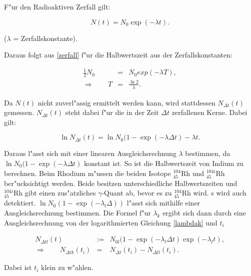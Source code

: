 		F"ur den Radioaktiven Zerfall gilt:

		\begin{equation}
			N(t) = N_0 \exp{(-\lambda t)}. \label{zerfall}
		\end{equation}

		\begin{center}
				\tiny{($\lambda$ = Zerfallskonstante).}
		\end{center}

		Daraus folgt aus \eqref{zerfall} f"ur die Halbwertszeit aus der Zerfallskonstanten:

		\begin{eqnarray}
			\frac{1}{2} N_0 &=& N_0 exp{(-\lambda T)}, \nonumber \\
			\Rightarrow \qquad T &=& \frac{\ln{2}}{\lambda}.
			\label{eqn:t_halb}
		\end{eqnarray}

		Da $N(t)$ nicht zuverl"assig ermittelt werden kann, wird stattdessen $N_{\Delta t}(t)$ gemessen. 
		$N_{\Delta t}(t)$ steht dabei f"ur die in der Zeit $\Delta t$ zerfallenen Kerne.
		Dabei gilt:

		\begin{equation}
			\ln{N_{\Delta t}(t)} = \ln{N_0 (1 - \exp{(-\lambda \Delta t)}} - \lambda t.
		\end{equation}
		
		Daraus l"asst sich mit einer linearen Ausgleichsrechnung $\lambda$ bestimmen, da \\
		$\ln{N_0 (1 - \exp{(-\lambda \Delta t)}}$ konstant ist.
		So ist die Halbwertszeit von Indium zu berechnen.
		Beim Rhodium m"ussen die beiden Isotope $^{104}_{45}\mathrm{Rh}$ und $^{104i}_{45}\mathrm{Rh}$ ber"ucksichtigt werden.
		Beide besitzen unterschiedliche Halbwertszeiten und $^{104i}_{45}\mathrm{Rh}$ gibt einen zus"atzliches $\gamma$-Quant ab, bevor es zu $^{104}_{45}\mathrm{Rh}$ wird.
		s wird auch detektiert.
		$\ln{N_0 (1 - \exp{(-\lambda_l \Delta) })}$ l"asst sich mithilfe einer Aus\-gleichs\-rech\-nung bestimmen.
		Die Formel f"ur $\lambda_k$ ergibt sich dann durch eine Ausgleichsrechnung von der logarithmierten Gleichung \eqref{lambdak} und $t_i$

		\begin{eqnarray}
			N_{\Delta tl}(t) &:=& N_{0l} (1-\exp{(-\lambda_l \Delta t)}\exp{(-\lambda_l t)},\nonumber\\
			\Rightarrow \qquad N_{\Delta tk}(t_i) &=& N_{\Delta t}(t_i) - N_{\Delta tl}(t_i). \label{lambdak}
		\end{eqnarray}

		Dabei ist $t_i$ klein zu w"ahlen.